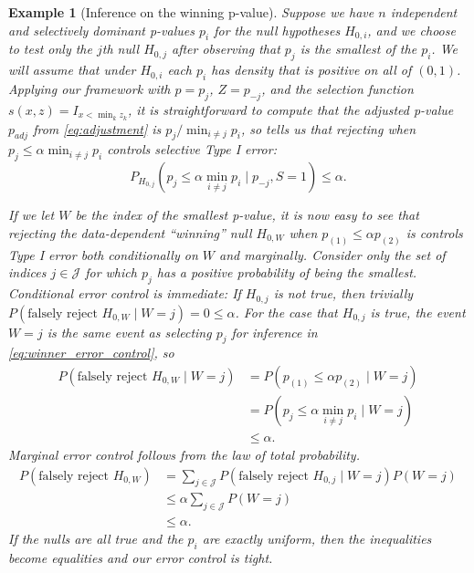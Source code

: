 \documentclass{article}
\newtheorem{example}{Example}
\begin{document}
\begin{example}[Inference on the winning p-value]
    \label{exm:winner} Suppose we have $n$ independent and selectively dominant p-values $p_i$ for the null hypotheses $H_{0, i}$, and we choose to test only the $j$th null $H_{0, j}$ after observing that $p_j$ is the smallest of the $p_i$. We will assume that under $H_{0, i}$ each $p_i$ has density that is positive on all of $(0, 1)$. Applying our framework with $p =p_j$, $Z = p_{-j}$, and the selection function $s(x, z) = I_{x < \min_{k} z_k}$, it is straightforward to compute that the adjusted p-value $p_{adj}$ from \eqref{eq:adjustment} is $p_j/\min_{i \neq j} p_i$, so  tells us that rejecting when $p_j \leq \alpha \min_{i \neq j} p_i$ controls selective Type I error:
    \begin{equation}
        \label{eq:winner_error_control}
        P_{H_{0, j}}(p_j \leq \alpha \min_{i \neq j} p_i \mid  p_{-j}, S = 1) \leq \alpha.
    \end{equation} 

    If we let $W$ be the index of the smallest p-value, it is now easy to see that rejecting the data-dependent ``winning'' null $H_{0, W}$ when $p_{(1)} \leq \alpha p_{(2)}$ is controls Type I error both conditionally on $W$ and marginally. Consider only the set of indices $j \in \mathcal{J}$ for which $p_j$ has a positive probability of being the smallest. Conditional error control is immediate: If $H_{0, j}$ is not true, then trivially $P(\text{falsely reject } H_{0, W} \mid W = j) = 0 \leq \alpha$. For the case that $H_{0, j}$ is true, the event $W=j$ is the same event as selecting $p_j$ for inference in \eqref{eq:winner_error_control}, so 
    \begin{align*}
        P(\text{falsely reject } H_{0, W} \mid W = j) &= P(p_{(1)} \leq \alpha p_{(2)} \mid W = j)\\
        &= P(p_j \leq \alpha \min_{i \neq j} p_i \mid W = j)\\
        &\leq \alpha.
    \end{align*}
     Marginal error control follows from the law of total probability. 
    \begin{align*}
        P(\text{falsely reject } H_{0, W}) &= \sum_{j \in \mathcal{J}} P(\text{falsely reject } H_{0, j} \mid W = j)P(W=j) \\
                                          &\leq \alpha \sum_{j \in \mathcal{J}} P(W=j)\\
                                          &\leq \alpha. 
    \end{align*}
    If the nulls are all true and the $p_i$ are exactly uniform, then the inequalities become equalities and our error control is tight. 
\end{example}
\end{document}
